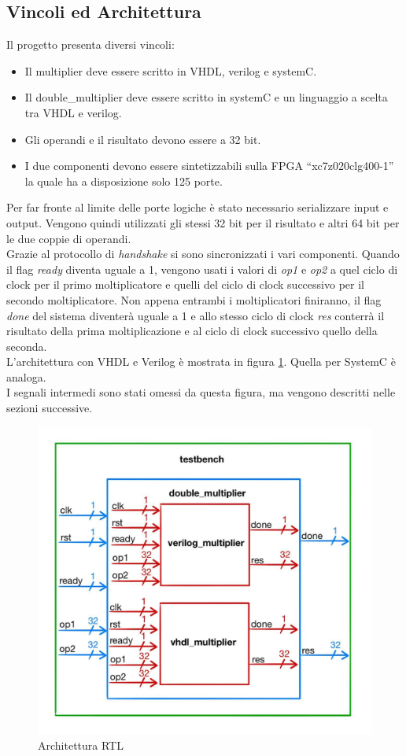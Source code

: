 \documentclass[]{IEEEtran}
\begin{document}
\subsection{Vincoli ed Architettura}
Il progetto presenta diversi vincoli:
\begin{itemize}
    \item Il multiplier deve essere scritto in VHDL, verilog e systemC.
    \item Il double\_multiplier deve essere scritto in systemC e un linguaggio a scelta tra VHDL e verilog.
    \item Gli operandi e il risultato devono essere a 32 bit.
    \item I due componenti devono essere sintetizzabili sulla FPGA ``xc7z020clg400-1'' la quale ha a disposizione solo 125 porte.
\end{itemize}
Per far fronte al limite delle porte logiche è stato necessario serializzare input e output. Vengono quindi utilizzati gli stessi 32 bit per il risultato e altri 64 bit per le due coppie di operandi.
\\Grazie al protocollo di \textit{handshake} si sono sincronizzati i vari componenti. Quando il flag \textit{ready} diventa uguale a 1, vengono usati i valori di \textit{op1} e \textit{op2} a quel ciclo di clock per il primo moltiplicatore e quelli del ciclo di clock successivo per il secondo moltiplicatore. Non appena entrambi i moltiplicatori finiranno, il flag \textit{done} del sistema diventerà uguale a 1 e allo stesso ciclo di clock \textit{res} conterrà il risultato della prima moltiplicazione e al ciclo di clock successivo quello della seconda.
\\L'architettura con VHDL e Verilog è mostrata in figura \ref{fig:Architettura}. Quella per SystemC è analoga. 
\\I segnali intermedi sono stati omessi da questa figura, ma vengono descritti nelle sezioni successive.
\begin{figure}[!htb]
    \centering
    \includegraphics[width=0.8\linewidth]{figures/architettura.jpg}
    \caption{Architettura RTL}
    \label{fig:Architettura}
\end{figure}
\end{document}
